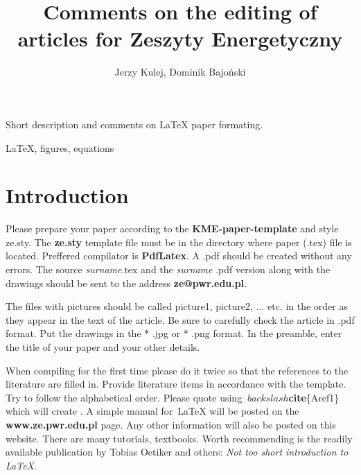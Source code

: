 \documentclass[polish,twoside]{article}
\title{Comments on the editing of articles for Zeszyty Energetyczny}
\author{Jerzy Kulej\affmark[1], Dominik Bajoński\affmark[2]}
\begin{document}
\maketitle

\begin{ZEabstract}
Short description and comments on LaTeX paper formating.
\end{ZEabstract}

\begin{keywords}
\LaTeX, figures, equations
\end{keywords}

\normalsize

\section{Introduction}

Please prepare your paper according to the \textbf{KME-paper-template} and style ze.sty.
The \textbf{ze.sty} template file must be in the directory where paper (.tex) file is located. Preffered compilator is \textbf{PdfLatex}. A .pdf should be created without any errors. The source \emph{surname}.tex and the \emph{surname} .pdf version along with the drawings should be sent to the address \textbf{ze@pwr.edu.pl}.

The files with pictures should be called picture1, picture2, ... etc. in the order as they appear in the text of the article. Be sure to carefully check the article in .pdf format. Put the drawings in the * .jpg or * .png format. In the preamble, enter the title of your paper and your other details.

When compiling for the first time please do it twice so that the references to the literature are filled in. Provide literature items in accordance with the template. Try to follow the alphabetical order. Please quote using \textbf{$\ backslash$cite}\{Aref1\} which will create \cite{Aref1}. A simple manual for\ LaTeX will be posted on the \textbf{www.ze.pwr.edu.pl} page. Any other information will also be posted on this website. There are many tutorials, textbooks. Worth recommending is the readily available publication by Tobias Oetiker and others: \textit{Not too short introduction to \LaTeX}.
\end{document}
